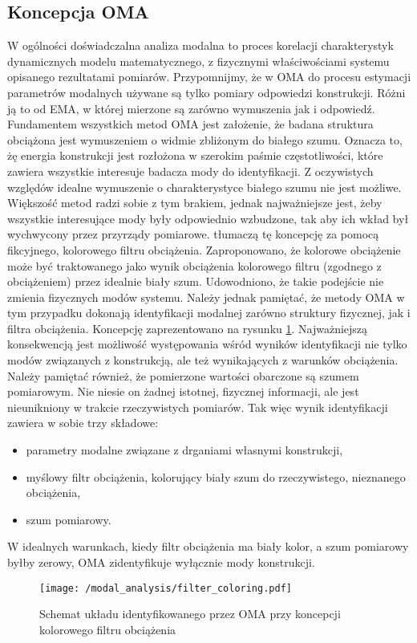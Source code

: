 \subsection{Koncepcja OMA}
W ogólności doświadczalna analiza modalna to proces korelacji charakterystyk dynamicznych modelu matematycznego, z fizycznymi właściwościami systemu opisanego rezultatami pomiarów. Przypomnijmy, że w OMA do procesu estymacji parametrów modalnych używane są tylko pomiary odpowiedzi konstrukcji. Różni ją to od EMA, w której mierzone są zarówno wymuszenia jak i odpowiedź. 
Fundamentem wszystkich metod OMA jest założenie, że badana struktura obciążona jest wymuszeniem o widmie zbliżonym do białego szumu. Oznacza to, żę energia konstrukcji jest rozłożona w szerokim paśmie częstotliwości, które zawiera wszystkie interesuje badacza mody do identyfikacji. Z oczywistych względów idealne wymuszenie o charakterystyce białego szumu nie jest możliwe. Większość metod radzi sobie z tym brakiem, jednak najważniejsze jest, żeby wszystkie interesujące mody były odpowiednio wzbudzone, tak aby ich wkład był wychwycony przez przyrządy pomiarowe. \cite{Brincker2015} tłumaczą tę koncepcję za pomocą fikcyjnego, kolorowego filtru obciążenia. Zaproponowano, że kolorowe obciążenie może być traktowanego jako wynik obciążenia kolorowego filtru (zgodnego z obciążeniem) przez idealnie biały szum. Udowodniono, że takie podejście nie zmienia fizycznych modów systemu. Należy jednak pamiętać, że metody OMA w tym przypadku dokonają identyfikacji modalnej zarówno struktury fizycznej, jak i filtra obciążenia. Koncepcję zaprezentowano na rysunku \ref{fig: color_filter_oma}. Najważniejszą konsekwencją jest możliwość występowania wśród wyników identyfikacji nie tylko modów związanych z konstrukcją, ale też wynikających z warunków obciążenia. Należy pamiętać również, że pomierzone wartości obarczone są szumem pomiarowym. Nie niesie on żadnej istotnej, fizycznej informacji, ale jest nieunikniony w trakcie rzeczywistych pomiarów. Tak więc wynik identyfikacji zawiera w sobie trzy składowe:
\begin{itemize}[noitemsep]
	\item parametry modalne związane z drganiami własnymi konstrukcji,
	\item myślowy filtr obciążenia, kolorujący biały szum do rzeczywistego, nieznanego obciążenia,
	\item szum pomiarowy.
\end{itemize} 
W idealnych warunkach, kiedy filtr obciążenia ma biały kolor, a szum pomiarowy byłby zerowy, OMA zidentyfikuje wyłącznie mody konstrukcji.
\begin{figure}[h] 
	\centering
	\texttt{[image: /modal\_analysis/filter\_coloring.pdf]}
	\captionsetup{justification=centering}
	\caption{Schemat układu identyfikowanego przez OMA przy koncepcji kolorowego filtru obciążenia}
	\label{fig: color_filter_oma}
\end{figure}


